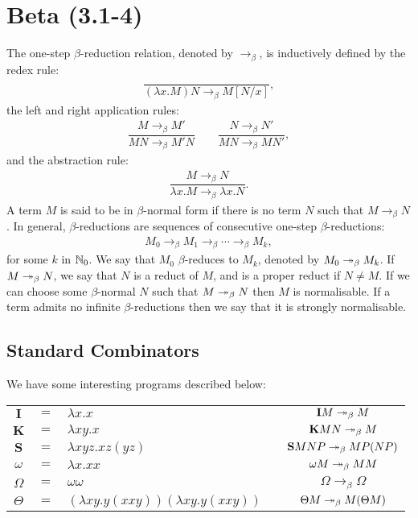 \section{Beta (3.1-4)}

The one-step $\beta$-reduction relation, denoted by 
$\to_\beta$, is inductively defined by the redex rule: 
\begin{align*}
    \dfrac{}{
        (\lambda x.M)N \to_\beta M[N/x]
    },
\end{align*} the left and right application rules: \begin{align*}
    \dfrac{M \to_\beta M'}{MN \to_\beta M'N}
    \qquad
    \dfrac{N \to_\beta N'}{MN \to_\beta MN'},
\end{align*} and the abstraction rule:
\begin{align*}
    \dfrac{M \to_\beta N}{\lambda x.M \to_\beta \lambda x.N}.
\end{align*} A term $M$ is said to be in $\beta$-normal form 
if there is no term $N$ such that $M \to_\beta N$.
In general, $\beta$-reductions are sequences of consecutive
one-step $\beta$-reductions: \begin{align*}
    M_0 \to_\beta M_1 \to_\beta \cdots \to_\beta M_k,
\end{align*} for some $k$ in $\mathbb{N}_0$. We say that
$M_0$ $\beta$-reduces to $M_k$, denoted by 
$M_0 \twoheadrightarrow_\beta M_k$.
If $M \twoheadrightarrow_\beta N$, we say that $N$ is a
reduct of $M$, and is a proper reduct if $N \neq M$.
If we can choose some $\beta$-normal $N$ such that
$M \twoheadrightarrow_\beta N$ then $M$ is normalisable.
If a term admits no infinite $\beta$-reductions then we say
that it is strongly normalisable. 

\subsection{Standard Combinators}

We have some interesting programs described below:
\begin{center}
    \begin{tabular}{ c c l p{1cm} c }
        $\mathbf{I}$ & $=$ & $\lambda x.x$ 
        && $\mathbf{I} M \twoheadrightarrow_\beta M$ \\
        $\mathbf{K}$ & $=$ & $\lambda xy.x$ 
        && $\mathbf{K} MN \twoheadrightarrow_\beta M$ \\
        $\mathbf{S}$ & $=$ & $\lambda xyz.xz(yz)$ 
        && $\mathbf{S} MNP \twoheadrightarrow_\beta MP(NP)$ \\
        $\omega$ & $=$ & $\lambda x.xx$ 
        && $\omega M \twoheadrightarrow_\beta MM$ \\
        $\Omega$ & $=$ & $\omega\omega$ 
        && $\Omega \to_\beta \Omega$ \\
        $\Theta$ & $=$ & $(\lambda xy.y(xxy))(\lambda xy.y(xxy))$ 
        && $\Theta M \twoheadrightarrow_\beta M(\Theta M)$
    \end{tabular}
\end{center}

